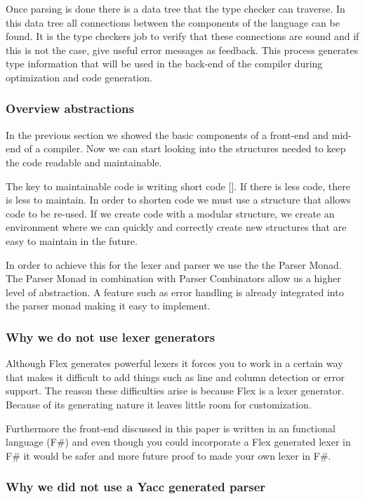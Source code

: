 Once parsing is done there is a data tree that the type checker can traverse. In this data tree all connections between the components of the language can be found. It is the type checkers job to verify that these connections are sound and if this is not the case, give useful error messages as feedback. This process generates type information that will be used in the back-end of the compiler during optimization and code generation. 

\subsubsection{Overview abstractions}

In the previous section we showed the basic components of a front-end and mid-end of a compiler. Now we can start looking into the structures needed to keep the code readable and maintainable. 

The key to maintainable code is writing short code []. If there is less code, there is less to maintain. In order to shorten code we must use a structure that allows code to be re-used. If we create code with a modular structure, we create an environment where we can quickly and correctly create new structures that are easy to maintain in the future. 

In order to achieve this for the lexer and parser we use the the Parser Monad. The Parser Monad in combination with Parser Combinators allow us a higher level of abstraction. A feature such as error handling is already integrated into the parser monad making it easy to implement. 

\subsubsection{Why we do not use lexer generators}

Although Flex generates powerful lexers it forces you to work in a certain way that makes it difficult to add things such as line and column detection or error support. The reason these difficulties arise is because Flex is a lexer generator. Because of its generating nature it leaves little room for customization. 

Furthermore the front-end discussed in this paper is written in an functional language (F\#) and even though you could incorporate a Flex generated lexer in F\# it would be safer and more future proof to made your own lexer in F\#. 

\subsubsection{Why we did not use a Yacc generated parser}

